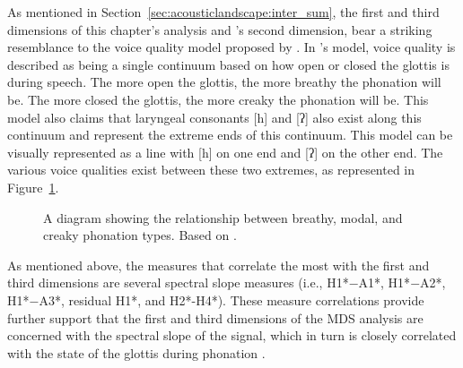 As mentioned in Section~\ref{sec:acousticlandscape:inter_sum}, the first and third dimensions of this chapter's analysis and \citeauthor{keatingCrosslanguageAcousticSpace2023}'s second dimension, bear a striking resemblance to the voice quality model proposed by \citet{gordonPhonationTypesCrosslinguistic2001}. In \citeauthor{gordonPhonationTypesCrosslinguistic2001}'s model, voice quality is described as being a single continuum based on how open or closed the glottis is during speech. The more open the glottis, the more breathy the phonation will be. The more closed the glottis, the more creaky the phonation will be. This model also claims that laryngeal consonants [h] and [ʔ] also exist along this continuum and represent the extreme ends of this continuum.  This model can be visually represented as a line with [h] on one end and [ʔ] on the other end. The various voice qualities exist between these two extremes, as represented in Figure~\ref{fig:phonation_types_1}.

\begin{figure}[h!]
    \centering
    \caption{A diagram showing the relationship between breathy, modal, and creaky phonation types. Based on \citet{gordonPhonationTypesCrosslinguistic2001}.}
    \label{fig:phonation_types_1}
\end{figure}

As mentioned above, the measures that correlate the most with the first and third dimensions are several spectral slope measures (i.e., H1*$-$A1*, H1*$-$A2*, H1*$-$A3*, residual H1*, and H2*-H4*). These measure correlations provide further support that the first and third dimensions of the MDS analysis are concerned with the spectral slope of the signal, which in turn is closely correlated with the state of the glottis during phonation \citep{holmbergComparisonsAerodynamicElectroglottographic1995,kreimanMeasuresGlottalSource2007,garellekModelingVoiceSource2016,garellekPhoneticsVoice2019,chaiH1H2AcousticMeasure2022}.


